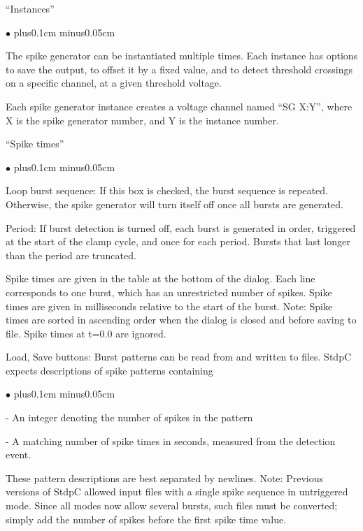 \documentclass{article}
\newenvironment{myitem}{\begin{list}{$\bullet$}{\setlength{\leftmargin}{1.1em}
\itemsep0.1cm plus0.1cm minus0.05cm
\listparindent0cm
\addtolength{\labelsep}{0.5\labelsep}
\setlength{\labelwidth}{0.8em}
\setlength{\leftmargin}{\labelwidth}
\addtolength{\leftmargin}{\labelsep}
}}{\end{list}}
\begin{document}
``Instances''
\begin{myitem}
	\item The spike generator can be instantiated multiple times. Each instance
	has options to save the output, to offset it by a fixed value, and to detect
	threshold crossings on a specific channel, at a given threshold voltage.
	\item Each spike generator instance creates a voltage channel named ``SG X:Y'',
	where X is the spike generator number, and Y is the instance number.
\end{myitem}

``Spike times''
\begin{myitem}
	\item Loop burst sequence: If this box is checked, the burst sequence is repeated.
	Otherwise, the spike generator will turn itself off once all bursts are generated.
	\item Period: If burst detection is turned off, each burst is generated in order,
	triggered at the start of the clamp cycle, and once for each period. Bursts that last
	longer than the period are truncated.
	\item Spike times are given in the table at the bottom of the dialog. Each line
	corresponds to one burst, which has an unrestricted number of spikes. Spike times
	are given in milliseconds relative to the start of the burst. Note: Spike times
	are sorted in ascending order when the dialog is closed and before saving to file.
	Spike times at t=0.0 are ignored.
	\item Load, Save buttons: Burst patterns can be read from and written to files.
	StdpC expects descriptions of spike patterns containing 
	\begin{myitem}
		\item[-] An integer denoting the number of spikes in the pattern
		\item[-] A matching number of spike times in seconds, measured from the
		detection event. 
	\end{myitem}
	These pattern descriptions are best separated by newlines. Note: Previous versions
	of StdpC allowed input files with a single spike sequence in untriggered mode. Since
	all modes now allow several bursts, such files must be converted; simply add the number
	of spikes before the first spike time value.
\end{myitem}
\end{document}
